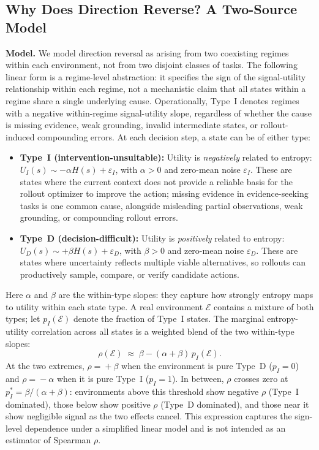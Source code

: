 \subsection{Why Does Direction Reverse? A Two-Source Model}
\label{sec:toy-model}
\vspace{-0.1in}
\textbf{Model.}
We model direction reversal as arising from two coexisting regimes within each environment, not from two disjoint classes of tasks. The following linear form is a regime-level abstraction: it specifies the sign of the signal-utility relationship within each regime, not a mechanistic claim that all states within a regime share a single underlying cause. Operationally, Type~I denotes regimes with a negative within-regime signal-utility slope, regardless of whether the cause is missing evidence, weak grounding, invalid intermediate states, or rollout-induced compounding errors. At each decision step, a state can be of either type:
\begin{itemize}[leftmargin=*,nosep]
\item \textbf{Type~I (intervention-unsuitable):} Utility is \emph{negatively} related to entropy: $U_I(s) \sim -\alpha H(s) + \varepsilon_I$, with $\alpha > 0$ and zero-mean noise $\varepsilon_I$. These are states where the current context does not provide a reliable basis for the rollout optimizer to improve the action; missing evidence in evidence-seeking tasks is one common cause, alongside misleading partial observations, weak grounding, or compounding rollout errors.
\item \textbf{Type~D (decision-difficult):} Utility is \emph{positively} related to entropy: $U_D(s) \sim +\beta H(s) + \varepsilon_D$, with $\beta > 0$ and zero-mean noise $\varepsilon_D$. These are states where uncertainty reflects multiple viable alternatives, so rollouts can productively sample, compare, or verify candidate actions.
\end{itemize}
Here $\alpha$ and $\beta$ are the within-type slopes: they capture how strongly entropy maps to utility within each state type. A real environment $\mathcal{E}$ contains a mixture of both types; let $p_I(\mathcal{E})$ denote the fraction of Type~I states. The marginal entropy-utility correlation across all states is a weighted blend of the two within-type slopes:
\begin{equation}
  \rho(\mathcal{E}) \;\approx\; \beta - (\alpha + \beta)\,p_I(\mathcal{E}).
  \label{eq:direction}
\end{equation}
At the two extremes, $\rho \!=\! +\beta$ when the environment is pure Type~D ($p_I\!=\!0$) and $\rho \!=\! -\alpha$ when it is pure Type~I ($p_I\!=\!1$). In between, $\rho$ crosses zero at $p_I^* = \beta/(\alpha+\beta)$: environments above this threshold show negative $\rho$ (Type~I dominated), those below show positive $\rho$ (Type~D dominated), and those near it show negligible signal as the two effects cancel. This expression captures the sign-level dependence under a simplified linear model and is not intended as an estimator of Spearman $\rho$. 
